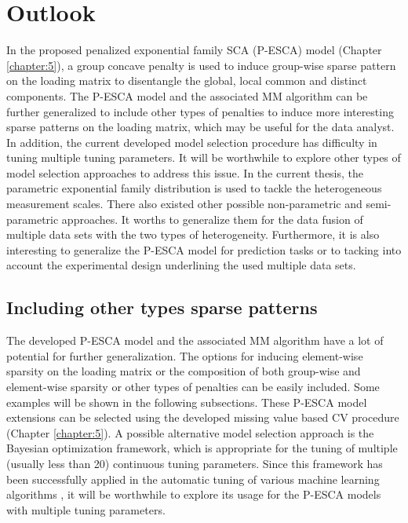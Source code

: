 \chapter{Outlook} \label{chapter:6}
In the proposed penalized exponential family SCA (P-ESCA) model (Chapter \ref{chapter:5}), a group concave penalty is used to induce group-wise sparse pattern on the loading matrix to disentangle the global, local common and distinct components. The P-ESCA model and the associated MM algorithm can be further generalized to include other types of penalties to induce more interesting sparse patterns on the loading matrix, which may be useful for the data analyst. In addition, the current developed model selection procedure has difficulty in tuning multiple tuning parameters. It will be worthwhile to explore other types of model selection approaches to address this issue. In the current thesis, the parametric exponential family distribution is used to tackle the heterogeneous measurement scales. There also existed other possible non-parametric and semi-parametric approaches. It worths to generalize them for the data fusion of multiple data sets with the two types of heterogeneity. Furthermore, it is also interesting to generalize the P-ESCA model for prediction tasks or to tacking into account the experimental design underlining the used multiple data sets.

\section{Including other types sparse patterns}
The developed P-ESCA model and the associated MM algorithm have a lot of potential for further generalization. The options for inducing element-wise sparsity on the loading matrix or the composition of both group-wise and element-wise sparsity or other types of penalties can be easily included. Some examples will be shown in the following subsections. These P-ESCA model extensions can be selected using the developed missing value based CV procedure (Chapter \ref{chapter:5}). A possible alternative model selection approach is the Bayesian optimization \cite{frazier2018tutorial} framework, which is appropriate for the tuning of multiple (usually less than 20) continuous tuning parameters. Since this framework has been successfully applied in the automatic tuning of various machine learning algorithms \cite{snoek2012practical}, it will be worthwhile to explore its usage for the P-ESCA models with multiple tuning parameters.

